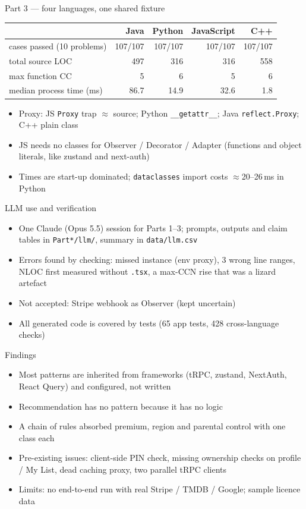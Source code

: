 \documentclass[aspectratio=169,10pt]{beamer}
\begin{document}
\begin{frame}{Part 3 --- four languages, one shared fixture}
\small
\begin{tabular}{@{}lrrrr@{}}\toprule
 & Java & Python & JavaScript & C++\\\midrule
cases passed (10 problems) & 107/107 & 107/107 & 107/107 & 107/107\\
total source LOC & 497 & 316 & 316 & 558\\
max function CC & 5 & 6 & 5 & 6\\
median process time (ms) & 86.7 & 14.9 & 32.6 & 1.8\\\bottomrule
\end{tabular}
\par\medskip
\begin{itemize}
\item Proxy: JS \texttt{Proxy} trap $\approx$ source; Python \texttt{\_\_getattr\_\_}; Java \texttt{reflect.Proxy}; C++ plain class
\item JS needs no classes for Observer / Decorator / Adapter (functions and object literals, like zustand and next-auth)
\item Times are start-up dominated; \texttt{dataclasses} import costs $\approx$20--26\,ms in Python
\end{itemize}
\end{frame}

\begin{frame}{LLM use and verification}
\small
\begin{itemize}
\item One Claude (Opus 5.5) session for Parts 1--3; prompts, outputs and claim tables in \texttt{Part*/llm/}, summary in \texttt{data/llm.csv}
\item Errors found by checking: missed instance (env proxy), 3 wrong line ranges, NLOC first measured without \texttt{.tsx}, a max-CCN rise that was a lizard artefact
\item Not accepted: Stripe webhook as Observer (kept uncertain)
\item All generated code is covered by tests (65 app tests, 428 cross-language checks)
\end{itemize}
\end{frame}

\begin{frame}{Findings}
\small
\begin{itemize}
\item Most patterns are inherited from frameworks (tRPC, zustand, NextAuth, React Query) and configured, not written
\item Recommendation has no pattern because it has no logic
\item A chain of rules absorbed premium, region and parental control with one class each
\item Pre-existing issues: client-side PIN check, missing ownership checks on profile / My List, dead caching proxy, two parallel tRPC clients
\item Limits: no end-to-end run with real Stripe / TMDB / Google; sample licence data
\end{itemize}
\end{frame}
\end{document}
